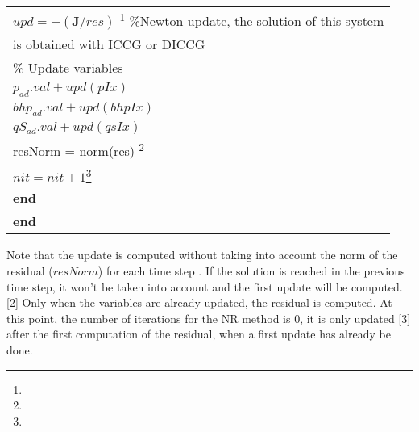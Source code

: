 \documentclass[12pt]{report}
\begin{document}
\begin{table}[!ht]
{\begin{tabu}{ |l |}
\hspace{2cm}$upd=-(\mathbf{J}/res)$ \footnote[1]{}   
\hspace{1.5cm}\%Newton update, the solution of this system\\
\hspace{7cm}is obtained with ICCG or DICCG\\
  \hspace{1.5cm}  \% Update variables\\
\hspace{2cm}$p_{ad}.val+upd(pIx)$ \\
\hspace{2cm}$bhp_{ad}.val+upd(bhpIx)$  \\
\hspace{2cm}$qS_{ad}.val+upd(qsIx)$   \\
\hspace{2cm} resNorm = norm(res) \footnote[2]{}\\
  \hspace{1.5cm}  $nit= nit + 1$\footnote[3]{}\\
\hspace{1cm} \textbf{end}\\
\hspace{0.5cm}\textbf{end}\\
\hline
\end{tabu}}
\end{table}
\newpage
[1] Note that the update is computed 
without taking into account the norm of the residual ($resNorm$) for each time step . If the solution is reached
in the previous time step, it won't be taken into account and the first update will be computed.
[2] Only when the variables are already updated, the residual is computed. At this point, the number 
of iterations for the NR method is 0, it is only updated [3] after the first computation of the residual, 
when a first update has already be done.\\
\end{document}
